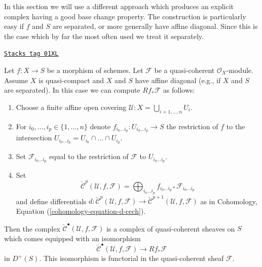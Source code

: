 \medskip\noindent
In this section we will use a different approach which produces an
explicit complex having a good base change property. The construction
is particularly easy if $f$ and $S$ are separated, or more generally
have affine diagonal. Since this is the case which
by far the most often used we treat it separately.

\begin{lemma}
\label{coherent-lemma-separated-case-relative-cech}
\href{https://stacks.math.columbia.edu/tag/01XL}{\texttt{Stacks tag 01XL}}

Let $f : X \to S$ be a morphism of schemes.
Let $\mathcal{F}$ be a quasi-coherent $\mathcal{O}_X$-module.
Assume $X$ is quasi-compact and $X$ and $S$ have affine diagonal
(e.g., if $X$ and $S$ are separated).
In this case we can compute $Rf_*\mathcal{F}$ as follows:
\begin{enumerate}
\item Choose a finite affine open covering
$\mathcal{U} : X = \bigcup_{i = 1, \ldots, n} U_i$.
\item For $i_0, \ldots, i_p \in \{1, \ldots, n\}$ denote
$f_{i_0 \ldots i_p} : U_{i_0 \ldots i_p} \to S$ the restriction of $f$
to the intersection $U_{i_0 \ldots i_p} = U_{i_0} \cap \ldots \cap U_{i_p}$.
\item Set $\mathcal{F}_{i_0 \ldots i_p}$ equal to the restriction
of $\mathcal{F}$ to $U_{i_0 \ldots i_p}$.
\item Set
$$
\check{\mathcal{C}}^p(\mathcal{U}, f, \mathcal{F}) =
\bigoplus\nolimits_{i_0 \ldots i_p}
f_{i_0 \ldots i_p *} \mathcal{F}_{i_0 \ldots i_p}
$$
and define differentials
$d : \check{\mathcal{C}}^p(\mathcal{U}, f, \mathcal{F})
\to \check{\mathcal{C}}^{p + 1}(\mathcal{U}, f, \mathcal{F})$
as in Cohomology, Equation (\ref{cohomology-equation-d-cech}).
\end{enumerate}
Then the complex $\check{\mathcal{C}}^\bullet(\mathcal{U}, f, \mathcal{F})$
is a complex of quasi-coherent sheaves on $S$ which comes equipped with an
isomorphism
$$
\check{\mathcal{C}}^\bullet(\mathcal{U}, f, \mathcal{F})
\longrightarrow
Rf_*\mathcal{F}
$$
in $D^{+}(S)$. This isomorphism is functorial in the quasi-coherent
sheaf $\mathcal{F}$.
\end{lemma}

